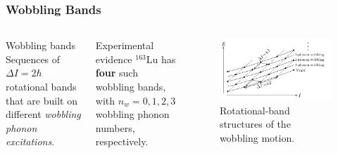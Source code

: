 \documentclass{beamer}
\begin{document}
\begin{frame}
\frametitle{Wobbling Bands}

\begin{columns} 
\begin{block}{Wobbling bands}
  Sequences of $\Delta I=2\hbar$ rotational bands that are built on different \textit{wobbling phonon excitations}.
  
\end{block}

\begin{exampleblock}{Experimental evidence}
    $^{163}$Lu has \textbf{four} such wobbling bands, with $n_w=0,1,2,3$ wobbling phonon numbers, respectively.
\end{exampleblock}

\begin{figure}
     \centering
     \includegraphics[scale=0.14]{figs/wobblingBands.png}
     \caption{Rotational-band structures of the wobbling motion.}
   \end{figure}
\end{columns}
\end{frame}
\end{document}
